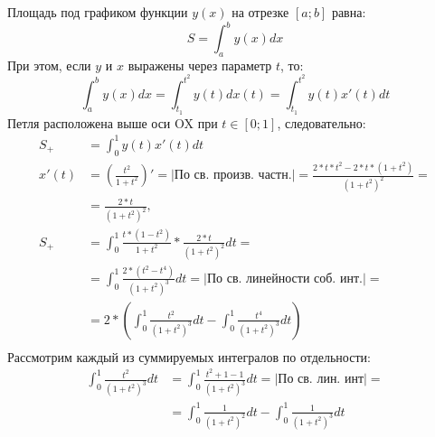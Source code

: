 \documentclass[12pt, a4paper]{article}
\begin{document}
Площадь под графиком функции $y(x)$ на отрезке $\left[a;b\right]$ равна:
\begin{equation*}
S = \int_a^b y(x)dx
\end{equation*}
При этом, если $y$ и $x$ выражены через параметр $t$, то:
\begin{equation*}
\int_a^b y(x)dx = \int_{t_1}^{t^2} y(t) dx(t) = \int_{t_1}^{t^2} y(t)x'(t) dt
\end{equation*}
Петля расположена выше оси OX при $t\in\left[0;1\right]$, следовательно:
\begin{equation*}
\begin{aligned}
S_{+} &= \int_{0}^{1} y(t)x'(t) dt\\
x'(t) &= \left(\frac{t^2}{1+t^2}\right)'=|\text{По св. произв. частн.}|=\frac{2*t*t^2 - 2 * t * (1+t^2)}{\left(1+t^2\right)^2} =\\
&= \frac{2*t}{\left(1+t^2\right)^2},\\
S_{+} &= \int_{0}^{1} \frac{t*(1-t^2)}{1+t^2} * \frac{2*t}{\left(1+t^2\right)^2} dt = \\
&= \int_{0}^{1} \frac{2*(t^2-t^4)}{\left(1+t^2\right)^3} dt=|\text{По св. линейности соб. инт.}|=\\
&= 2 * \left(\int_{0}^{1} \frac{t^2}{\left(1+t^2\right)^3} dt - \int_{0}^{1} \frac{t^4}{\left(1+t^2\right)^3} dt\right)\\
\end{aligned}
\end{equation*}
Рассмотрим каждый из суммируемых интегралов по отдельности:
\begin{equation*}
\begin{aligned}
\int_{0}^{1} \frac{t^2}{\left(1+t^2\right)^3} dt &= \int_{0}^{1} \frac{t^2 + 1 - 1}{\left(1+t^2\right)^3} dt =|\text{По св. лин. инт}| = \\
&= \int_{0}^{1} \frac{1}{\left(1+t^2\right)^2} dt - \int_{0}^{1} \frac{1}{\left(1+t^2\right)^3} dt
\end{aligned}
\end{equation*}
\end{document}
